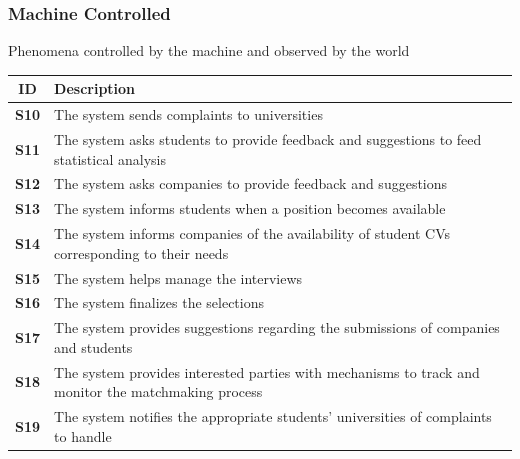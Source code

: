 \subsubsection{Machine Controlled}
Phenomena controlled by the machine and observed by the world
\renewcommand{\arraystretch}{1.5} %
\begin{center}
    \begin{longtable}{|c|p{}|}
        \hline
        \rowcolor[HTML]{BDFCC9}
        \textbf{ID} & \textbf{Description} \\ \hline
        \rowcolor[HTML]{FFFFFF} %
        \textbf{S10} & The system sends complaints to universities \\ \hline
        \rowcolor[HTML]{F0F0F0} %
        \textbf{S11} & The system asks students to provide feedback and suggestions to feed statistical analysis \\ \hline
        \rowcolor[HTML]{FFFFFF} %
        \textbf{S12} & The system asks companies to provide feedback and suggestions \\ \hline
        \rowcolor[HTML]{F0F0F0} %
        \textbf{S13} & The system informs students when a position becomes available \\ \hline
        \rowcolor[HTML]{FFFFFF} %
        \textbf{S14} & The system informs companies of the availability of student CVs corresponding to their needs \\ \hline
        \rowcolor[HTML]{F0F0F0} %
        \textbf{S15} & The system helps manage the interviews \\ \hline
        \rowcolor[HTML]{FFFFFF} %
        \textbf{S16} & The system finalizes the selections \\ \hline
        \rowcolor[HTML]{F0F0F0} %
        \textbf{S17} & The system provides suggestions regarding the submissions of companies and students \\ \hline
        \rowcolor[HTML]{FFFFFF} %
        \textbf{S18} & The system provides interested parties with mechanisms to track and monitor the matchmaking process \\ \hline
        \rowcolor[HTML]{F0F0F0} %
        \textbf{S19} & The system notifies the appropriate students' universities of complaints to handle \\ \hline
    \end{longtable}
\end{center}

